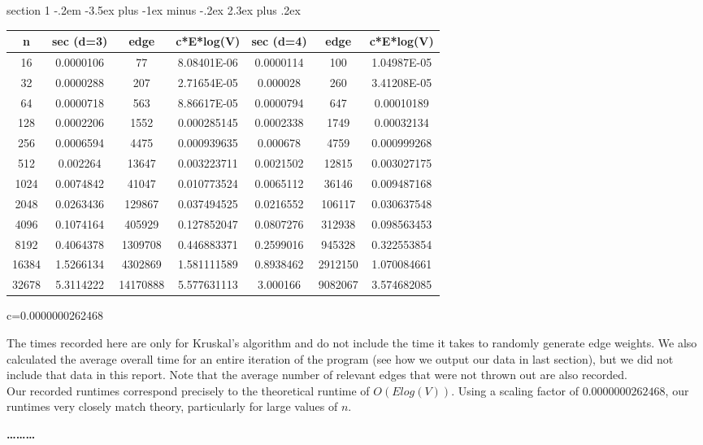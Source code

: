 \documentclass[12pt]{article}
\makeatletter
\newenvironment{problem}{\@startsection
       {section}
       {1}
       {-.2em}
       {-3.5ex plus -1ex minus -.2ex}
       {2.3ex plus .2ex}
       {\pagebreak[3]%
       \large\bf\noindent{Problem }
       }
       }
       {%
       \begin{center}\large\bf \ldots\ldots\ldots\end{center}}
\makeatother
\begin{document}
\begin{problem}{}
\begin{tabular}{ | c|c|c|c | c | c |c|}
  \hline                        
  n & sec (d=3) & edge & c*E*log(V) & sec (d=4) & edge & c*E*log(V) \\
  \hline
16&0.0000106&77&8.08401E-06&0.0000114&100&1.04987E-05\\
32&0.0000288&207&2.71654E-05&0.000028&260&3.41208E-05\\
64&0.0000718&563&8.86617E-05&0.0000794&647&0.00010189\\
128&0.0002206&1552&0.000285145&0.0002338&1749&0.00032134\\
256&0.0006594&4475&0.000939635&0.000678&4759&0.000999268\\
512&0.002264&13647&0.003223711&0.0021502&12815&0.003027175\\
1024&0.0074842&41047&0.010773524&0.0065112&36146&0.009487168\\
2048&0.0263436&129867&0.037494525&0.0216552&106117&0.030637548\\
4096&0.1074164&405929&0.127852047&0.0807276&312938&0.098563453\\
8192&0.4064378&1309708&0.446883371&0.2599016&945328&0.322553854\\
16384&1.5266134&4302869&1.581111589&0.8938462&2912150&1.070084661\\
32678&5.3114222&14170888&5.577631113&3.000166&9082067&3.574682085\\
  \hline  
\end{tabular}

c=0.0000000262468
\vspace{5mm}

\noindent The times recorded here are only for Kruskal's algorithm and do not
include the time it takes to randomly generate edge weights. We also
calculated the average overall time for an entire iteration of the
program (see how we output our data in last section), but we did not
include that data in this report. Note that the average number of
relevant edges that were not thrown out are also recorded.\\

\noindent Our recorded runtimes correspond precisely to the theoretical runtime
of $O(E log(V))$. Using a scaling factor of $0.0000000262468$, our
runtimes very closely match theory, particularly for large values of $n$.

\end{problem}
\end{document}
